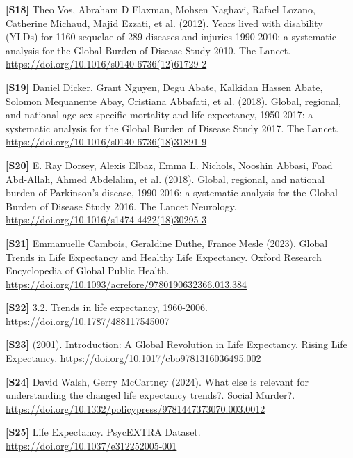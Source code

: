 \documentclass[10pt,a4paper]{article}
\begin{document}
\noindent\textbf{[S18]} Theo Vos, Abraham D Flaxman, Mohsen Naghavi, Rafael Lozano, Catherine Michaud, Majid Ezzati, et al. (2012). Years lived with disability (YLDs) for 1160 sequelae of 289 diseases and injuries 1990-2010: a systematic analysis for the Global Burden of Disease Study 2010. The Lancet. \url{https://doi.org/10.1016/s0140-6736(12)61729-2}\par

\noindent\textbf{[S19]} Daniel Dicker, Grant Nguyen, Degu Abate, Kalkidan Hassen Abate, Solomon Mequanente Abay, Cristiana Abbafati, et al. (2018). Global, regional, and national age-sex-specific mortality and life expectancy, 1950-2017: a systematic analysis for the Global Burden of Disease Study 2017. The Lancet. \url{https://doi.org/10.1016/s0140-6736(18)31891-9}\par

\noindent\textbf{[S20]} E. Ray Dorsey, Alexis Elbaz, Emma L. Nichols, Nooshin Abbasi, Foad Abd-Allah, Ahmed Abdelalim, et al. (2018). Global, regional, and national burden of Parkinson's disease, 1990-2016: a systematic analysis for the Global Burden of Disease Study 2016. The Lancet Neurology. \url{https://doi.org/10.1016/s1474-4422(18)30295-3}\par

\noindent\textbf{[S21]} Emmanuelle Cambois, Geraldine Duthe, France Mesle (2023). Global Trends in Life Expectancy and Healthy Life Expectancy. Oxford Research Encyclopedia of Global Public Health. \url{https://doi.org/10.1093/acrefore/9780190632366.013.384}\par

\noindent\textbf{[S22]} 3.2. Trends in life expectancy, 1960-2006. \url{https://doi.org/10.1787/488117545007}\par

\noindent\textbf{[S23]} (2001). Introduction: A Global Revolution in Life Expectancy. Rising Life Expectancy. \url{https://doi.org/10.1017/cbo9781316036495.002}\par

\noindent\textbf{[S24]} David Walsh, Gerry McCartney (2024). What else is relevant for understanding the changed life expectancy trends?. Social Murder?. \url{https://doi.org/10.1332/policypress/9781447373070.003.0012}\par

\noindent\textbf{[S25]} Life Expectancy. PsycEXTRA Dataset. \url{https://doi.org/10.1037/e312252005-001}\par
\end{document}
